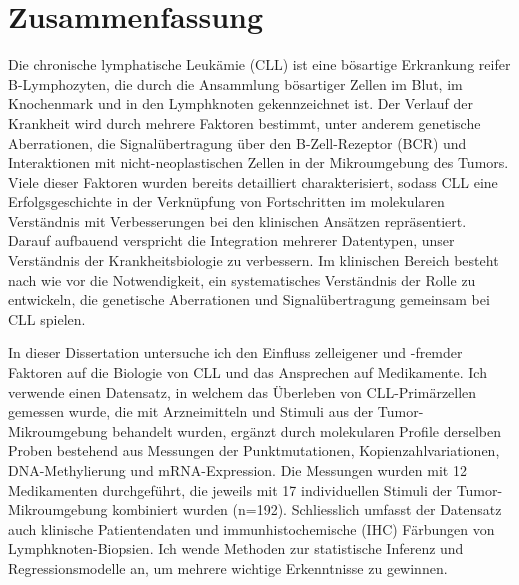 \documentclass[11pt, a4paper, twosided]{book}
\begin{document}
\begin{sloppypar}
    \hypertarget{zusammenfassung}{%
    \chapter*{Zusammenfassung}\label{zusammenfassung}}

    Die chronische lymphatische Leukämie (CLL) ist eine bösartige Erkrankung reifer B-Lymphozyten, die durch die Ansammlung bösartiger Zellen im Blut, im Knochenmark und in den Lymphknoten gekennzeichnet ist. Der Verlauf der Krankheit wird durch mehrere Faktoren bestimmt, unter anderem genetische Aberrationen, die Signalübertragung über den B-Zell-Rezeptor (BCR) und Interaktionen mit nicht-neoplastischen Zellen in der Mikroumgebung des Tumors. Viele dieser Faktoren wurden bereits detailliert charakterisiert, sodass CLL eine Erfolgsgeschichte in der Verknüpfung von Fortschritten im molekularen Verständnis mit Verbesserungen bei den klinischen Ansätzen repräsentiert. Darauf aufbauend verspricht die Integration mehrerer Datentypen, unser Verständnis der Krankheitsbiologie zu verbessern. Im klinischen Bereich besteht nach wie vor die Notwendigkeit, ein systematisches Verständnis der Rolle zu entwickeln, die genetische Aberrationen und Signalübertragung gemeinsam bei CLL spielen.

    In dieser Dissertation untersuche ich den Einfluss zelleigener und -fremder Faktoren auf die Biologie von CLL und das Ansprechen auf Medikamente. Ich verwende einen Datensatz, in welchem das Überleben von CLL-Primärzellen gemessen wurde, die mit Arzneimitteln und Stimuli aus der Tumor-Mikroumgebung behandelt wurden, ergänzt durch molekularen Profile derselben Proben bestehend aus Messungen der Punktmutationen, Kopienzahlvariationen, DNA-Methylierung und mRNA-Expression. Die Messungen wurden mit 12 Medikamenten durchgeführt, die jeweils mit 17 individuellen Stimuli der Tumor-Mikroumgebung kombiniert wurden (n=192). Schliesslich umfasst der Datensatz auch klinische Patientendaten und immunhistochemische (IHC) Färbungen von Lymphknoten-Biopsien. Ich wende Methoden zur statistische Inferenz und Regressionsmodelle an, um mehrere wichtige Erkenntnisse zu gewinnen.


\end{sloppypar}
\end{document}
